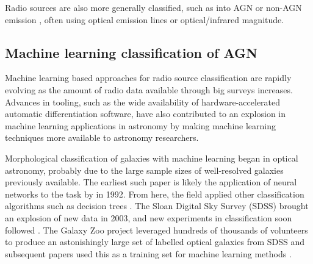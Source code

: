         Radio sources are also more generally classified, such as into AGN or non-AGN emission \citep{koziel-wierzbowska_identifying_2020}, often using optical emission lines or optical/infrared magnitude.

    \subsection{Machine learning classification of AGN}
    \label{sec:ml-classification-of-agn}

        Machine learning based approaches for radio source classification are rapidly evolving as the amount of radio data available through big surveys increases. Advances in tooling, such as the wide availability of hardware-accelerated automatic differentiation software, have also contributed to an explosion in machine learning applications in astronomy by making machine learning techniques more available to astronomy researchers.

        Morphological classification of galaxies with machine learning began in optical astronomy, probably due to the large sample sizes of well-resolved galaxies previously available. The earliest such paper is likely the application of neural networks to the task by \citeauthor{storrie-lombardi_morphological_1992} in 1992. From here, the field applied other classification algorithms such as decision trees \citep[e.g.][]{owens_using_1996}. The Sloan Digital Sky Survey (SDSS) brought an explosion of new data in 2003, and new experiments in classification soon followed \citep[e.g.][]{ball_galaxy_2004,ball_robust_2006}. The Galaxy Zoo project leveraged hundreds of thousands of volunteers to produce an astonishingly large set of labelled optical galaxies from SDSS and subsequent papers used this as a training set for machine learning methods \citep{banerji_galaxy_2010,dieleman15cnn,zhu_galaxy_2019}.

